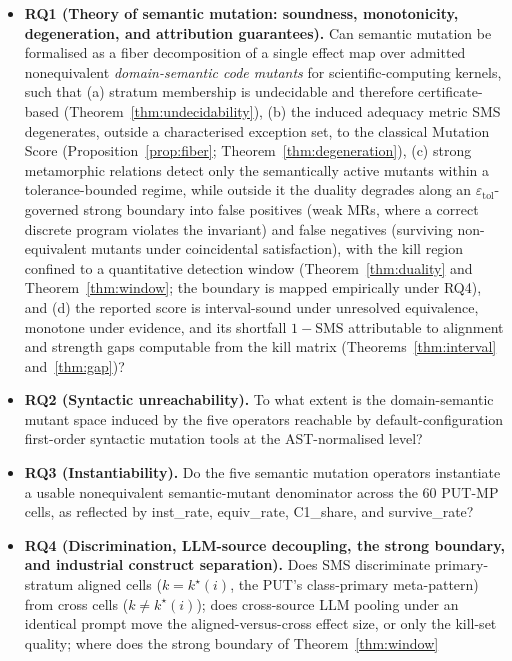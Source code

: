 \documentclass[manuscript,screen,review]{acmart}
\begin{document}
\begin{itemize}

\item
  \textbf{RQ1 (Theory of semantic mutation: soundness, monotonicity,
  degeneration, and attribution guarantees).} Can semantic
  mutation be formalised as a fiber decomposition of a single effect map
  over admitted nonequivalent \emph{domain-semantic code mutants} for
  scientific-computing kernels, such that (a) stratum membership is
  undecidable and therefore certificate-based (Theorem~\ref{thm:undecidability}), (b) the
  induced adequacy metric SMS degenerates, outside a characterised
  exception set, to the
  classical Mutation Score (Proposition~\ref{prop:fiber}; Theorem~\ref{thm:degeneration}), (c)
  strong metamorphic relations detect only the semantically active
  mutants within a tolerance-bounded regime, while outside it the duality
  degrades along an $\varepsilon_{\mathrm{tol}}$-governed strong boundary
  into false positives (weak MRs, where a correct discrete program
  violates the invariant) and false negatives (surviving non-equivalent
  mutants under coincidental satisfaction), with the kill region confined
  to a quantitative detection window (Theorem~\ref{thm:duality} and Theorem~\ref{thm:window};
  the boundary is mapped empirically under RQ4), and (d) the reported
  score is interval-sound under unresolved equivalence, monotone under
  evidence, and its shortfall $1-\mathrm{SMS}$ attributable to alignment
  and strength gaps computable from the kill matrix
  (Theorems~\ref{thm:interval} and~\ref{thm:gap})?
\item
  \textbf{RQ2 (Syntactic unreachability).} To what extent is the
  domain-semantic mutant space induced by the five operators reachable
  by default-configuration first-order syntactic mutation tools at the
  AST-normalised level?
\item
  \textbf{RQ3 (Instantiability).} Do the five semantic mutation
  operators instantiate a usable nonequivalent semantic-mutant
  denominator across the 60 PUT-MP cells, as reflected by
  inst\_rate, equiv\_rate, C1\_share, and survive\_rate?
\item
  \textbf{RQ4 (Discrimination, LLM-source decoupling, the strong
  boundary, and industrial construct separation).} Does SMS discriminate
  primary-stratum aligned cells ($k = k^\star(i)$, the PUT's
  class-primary meta-pattern) from
  cross cells ($k \neq k^\star(i)$); does cross-source LLM pooling under an
  identical prompt move the aligned-versus-cross effect size, or only the
  kill-set quality; where does the strong boundary of Theorem~\ref{thm:window}

\end{itemize}
\end{document}
